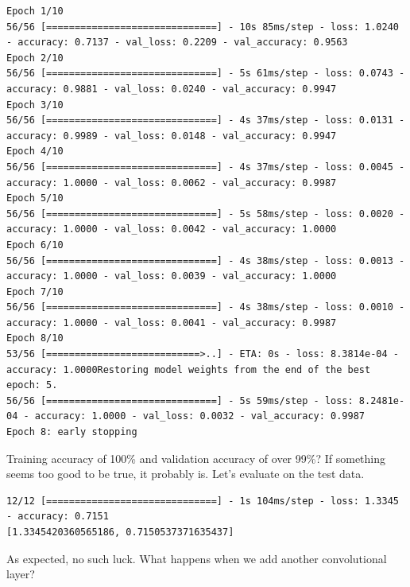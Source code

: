 \documentclass{article}
\begin{document}


\begin{lstlisting}[style=output]
Epoch 1/10
56/56 [==============================] - 10s 85ms/step - loss: 1.0240 - accuracy: 0.7137 - val_loss: 0.2209 - val_accuracy: 0.9563
Epoch 2/10
56/56 [==============================] - 5s 61ms/step - loss: 0.0743 - accuracy: 0.9881 - val_loss: 0.0240 - val_accuracy: 0.9947
Epoch 3/10
56/56 [==============================] - 4s 37ms/step - loss: 0.0131 - accuracy: 0.9989 - val_loss: 0.0148 - val_accuracy: 0.9947
Epoch 4/10
56/56 [==============================] - 4s 37ms/step - loss: 0.0045 - accuracy: 1.0000 - val_loss: 0.0062 - val_accuracy: 0.9987
Epoch 5/10
56/56 [==============================] - 5s 58ms/step - loss: 0.0020 - accuracy: 1.0000 - val_loss: 0.0042 - val_accuracy: 1.0000
Epoch 6/10
56/56 [==============================] - 4s 38ms/step - loss: 0.0013 - accuracy: 1.0000 - val_loss: 0.0039 - val_accuracy: 1.0000
Epoch 7/10
56/56 [==============================] - 4s 38ms/step - loss: 0.0010 - accuracy: 1.0000 - val_loss: 0.0041 - val_accuracy: 0.9987
Epoch 8/10
53/56 [===========================>..] - ETA: 0s - loss: 8.3814e-04 - accuracy: 1.0000Restoring model weights from the end of the best epoch: 5.
56/56 [==============================] - 5s 59ms/step - loss: 8.2481e-04 - accuracy: 1.0000 - val_loss: 0.0032 - val_accuracy: 0.9987
Epoch 8: early stopping
\end{lstlisting}

Training accuracy of 100\% and validation accuracy of over 99\%? If something seems too good to be true, it probably is. Let's evaluate on the test data.



\begin{lstlisting}[style=output]
12/12 [==============================] - 1s 104ms/step - loss: 1.3345 - accuracy: 0.7151
[1.3345420360565186, 0.7150537371635437] 
\end{lstlisting}

As expected, no such luck. What happens when we add another convolutional layer?


\end{document}
